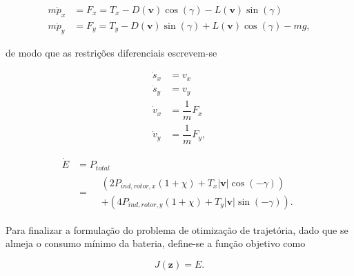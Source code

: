\begin{equation}
\begin{aligned}
    m\ddot{p}_x &= F_x = T_x - D(\mathbf{v}) \cos(\gamma) - L(\mathbf{v}) \sin(\gamma) \\
    m\ddot{p}_y &= F_y = T_y - D(\mathbf{v}) \sin(\gamma) + L(\mathbf{v}) \cos(\gamma) - mg,
\end{aligned}
\end{equation}

\noindent de modo que as restrições diferenciais escrevem-se

\begin{equation}
\begin{aligned}
    \dot{s}_x &= v_x \\
    \dot{s}_y &= v_y \\
    \dot{v}_x &= \dfrac{1}{m} F_x \\
    \dot{v}_y &= \dfrac{1}{m} F_y,
\end{aligned}
\end{equation}

\begin{equation}
\begin{aligned}
    \dot{E}
    &= P_{total} \\
    &=
    \begin{aligned}
        &\left( 2 P_{ind,rotor,x} (1 + \chi) + T_x |\mathbf{v}| \cos(-\gamma) \right) \\
        &+ \left( 4 P_{ind,rotor,y} (1 + \chi) + T_y |\mathbf{v}| \sin(-\gamma) \right).
    \end{aligned}
\end{aligned}
\end{equation}

Para finalizar a formulação do problema de otimização de trajetória, dado que se almeja o consumo mínimo da bateria, define-se a função objetivo como

\begin{equation}
    J(\mathbf{z}) = E.
\end{equation}

